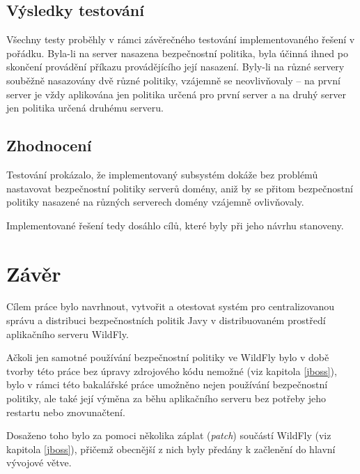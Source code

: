 \section{Výsledky testování}

Všechny testy proběhly v rámci závěrečného testování implementovaného řešení v pořádku.
Byla-li na server nasazena bezpečnostní politika, byla účinná ihned po skončení provádění příkazu provádějícího její nasazení.
Byly-li na různé servery souběžně nasazovány dvě různé politiky, vzájemně se neovlivňovaly -- na první server je vždy aplikována jen politika určená pro první server a na druhý server jen politika určená druhému serveru.

\section{Zhodnocení}

Testování prokázalo, že implementovaný subsystém dokáže bez problémů nastavovat bezpečnostní politiky serverů domény, aniž by se přitom bezpečnostní politiky nasazené na různých serverech domény vzájemně ovlivňovaly.

Implementované řešení tedy dosáhlo cílů, které byly při jeho návrhu stanoveny.

\chapter{Závěr}

Cílem práce bylo navrhnout, vytvořit a otestovat systém pro centralizovanou správu a distribuci bezpečnostních politik Javy v distribuovaném prostředí aplikačního serveru WildFly.

Ačkoli jen samotné používání bezpečnostní politiky ve WildFly bylo v době tvorby této práce bez úpravy zdrojového kódu nemožné (viz kapitola \ref{jboss}),
bylo v rámci této bakalářské práce umožněno nejen používání bezpečnostní politiky, ale také její výměna za běhu aplikačního serveru bez potřeby
jeho restartu nebo znovunačtení.

Dosaženo toho bylo za pomoci několika záplat ({\it patch}) součástí WildFly (viz kapitola \ref{jboss}), přičemž obecnější z nich byly předány
k začlenění do hlavní vývojové větve. \cite{smPullRequest}\cite{jbossModulesPullRequest}

